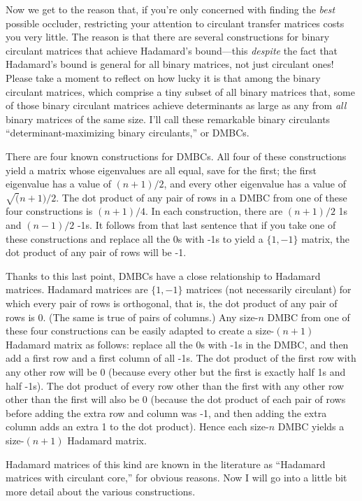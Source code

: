 Now we get to the reason that, if you're only concerned with finding the \emph{best} possible occluder, restricting your attention to circulant transfer matrices costs you very little. The reason is that there are several constructions for binary circulant matrices that achieve Hadamard's bound---this \emph{despite} the fact that Hadamard's bound is general for all binary matrices, not just circulant ones! Please take a moment to reflect on how lucky it is that among the binary circulant matrices, which comprise a tiny subset of all binary matrices that, some of those binary circulant matrices achieve determinants as large as any from \emph{all} binary matrices of the same size. I'll call these remarkable binary circulants ``determinant-maximizing binary circulants,'' or DMBCs.

There are four known constructions for DMBCs. All four of these constructions yield a matrix whose eigenvalues are all equal, save for the first; the first eigenvalue has a value of $(n+1)/2$, and every other eigenvalue has a value of $\sqrt(n+1)/2$. The dot product of any pair of rows in a DMBC from one of these four constructions is $(n+1)/4$. In each construction, there are $(n+1)/2$ 1s and $(n-1)/2$ -1s. It follows from that last sentence that if you take one of these constructions and replace all the 0s with -1s to yield a $\{1, -1\}$ matrix, the dot product of any pair of rows will be -1.

Thanks to this last point, DMBCs have a close relationship to Hadamard matrices. Hadamard matrices are $\{1, -1\}$ matrices (not necessarily circulant) for which every pair of rows is orthogonal, that is, the dot product of any pair of rows is 0. (The same is true of pairs of columns.) Any size-$n$ DMBC from one of these four constructions can be easily adapted to create a size-$(n+1)$ Hadamard matrix as follows: replace all the 0s with -1s in the DMBC, and then add a first row and a first column of all -1s. The dot product of the first row with any other row will be 0 (because every other but the first is exactly half 1s and half -1s). The dot product of every row other than the first with any other row other than the first will also be 0 (because the dot product of each pair of rows before adding the extra row and column was -1, and then adding the extra column adds an extra 1 to the dot product). Hence each size-$n$ DMBC yields a size-$(n+1)$ Hadamard matrix.

Hadamard matrices of this kind are known in the literature as ``Hadamard matrices with circulant core,'' for obvious reasons. Now I will go into a little bit more detail about the various constructions.

